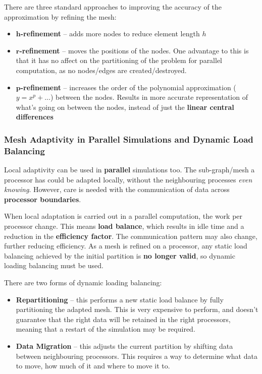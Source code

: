 \documentclass{article}
\begin{document}
There are three standard approaches to improving the accuracy of the approximation by refining the mesh:
\begin{itemize}
	\item \textbf{$\mathbf{h}$-refinement} -- adds more nodes to reduce element length $h$
	\item \textbf{$\mathbf{r}$-refinement} -- moves the positions of the nodes. One advantage to this is that it has no affect on the partitioning of the problem for parallel computation, as no nodes/edges are created/destroyed.
	\item \textbf{$\mathbf{p}$-refinement} -- increases the order of the polynomial approximation ($y = x^p + ...$) between the nodes. Results in more accurate representation of what's going on between the nodes, instead of just the \textbf{linear central differences}
\end{itemize}

\subsubsection{Mesh Adaptivity in Parallel Simulations and Dynamic Load Balancing}

Local adaptivity can be used in \textbf{parallel} simulations too. The sub-graph/mesh a processor has could be adapted locally, without the neighbouring processes \textit{even knowing}. However, care is needed with the communication of data across \textbf{processor boundaries}.

When local adaptation is carried out in a parallel computation, the work per processor change. This means \textbf{load balance}, which results in idle time and a reduction in the \textbf{efficiency factor}. The communication pattern may also change, further reducing efficiency. As a mesh is refined on a processor, any static load balancing achieved by the initial partition is \textbf{no longer valid}, so dynamic loading balancing must be used.

There are two forms of dynamic loading balancing:
\begin{itemize}
	\item \textbf{Repartitioning} -- this performs a new static load balance by fully partitioning the adapted mesh. This is very expensive to perform, and doesn't guarantee that the right data will be retained in the right processors, meaning that a restart of the simulation may be required. 
	\item \textbf{Data Migration} -- this adjusts the current partition by shifting data between neighbouring processors. This requires a way to determine what data to move, how much of it and where to move it to.
\end{itemize}
\end{document}
